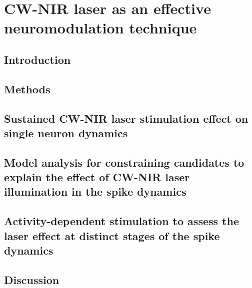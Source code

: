 \chapter{CW-NIR laser as an effective neuromodulation technique}
\label{c-laser}

\section{Introduction}
\label{sect:intro} 



\section{Methods}



\section{Sustained CW-NIR laser stimulation effect on single neuron dynamics}
\label{sec:sustained effect}


\section{Model analysis for constraining candidates to explain the effect of CW-NIR laser illumination in the spike dynamics}
\label{sec:laser models}


\section{Activity-dependent stimulation to assess the laser effect at distinct stages of the spike dynamics} 
\label{sec:activity dependent}



\section{Discussion}
